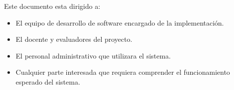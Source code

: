 Este documento esta dirigido a:

\begin{itemize}
    \item El equipo de desarrollo de software encargado de la implementación.
    \item El docente y evaluadores del proyecto.
    \item El personal administrativo que utilizara el sistema.
    \item Cualquier parte interesada que requiera comprender el funcionamiento esperado del sistema.
\end{itemize}
